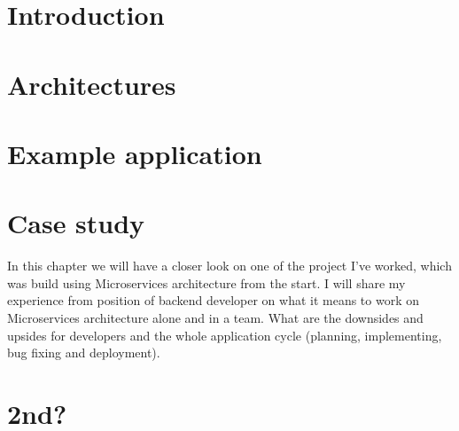 \chapter*{Introduction}


\setcounter{page}{1}

\begin{chapterabstract}
    \lipsum[1]
\end{chapterabstract}

\lipsum[1]

\chapter{Architectures}





\chapter{Example application}


\chapter{Case study}
In this chapter we will have a closer look on one of the project I've worked, which was build using Microservices architecture from the start. I will share my experience from position of backend developer on what it means to work on Microservices architecture alone and in a team. What are the downsides and upsides for developers and the whole application cycle (planning, implementing, bug fixing and deployment).



\chapter{2nd?}
